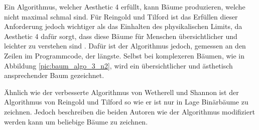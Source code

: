 Ein Algorithmus, welcher Aesthetic 4 erfüllt, kann Bäume produzieren, welche nicht maximal schmal sind. 
Für Reingold und Tilford ist das Erfüllen dieser Anforderung jedoch wichtiger als das Einhalten des physikalischen Limits, 
da Aesthetic 4 dafür sorgt, dass diese Bäume für Menschen übersichtlicher und leichter zu verstehen sind \cite[S. 224]{q2}. Dafür ist der Algorithmus 
jedoch, gemessen an den Zeilen im Programmcode, der längste. Selbst bei komplexeren Bäumen, wie in Abbildung \ref{pic:baum_algo_3_n2},
wird ein übersichtlicher und ästhetisch ansprechender Baum gezeichnet. 

Ähnlich wie der verbesserte Algorithmus von Wetherell und Shannon ist der Algorithmus von Reingold und Tilford so wie er ist nur in Lage
Binärbäume zu zeichnen. Jedoch beschreiben die beiden Autoren wie der Algorithmus modifiziert werden kann um beliebige Bäume zu zeichnen.

